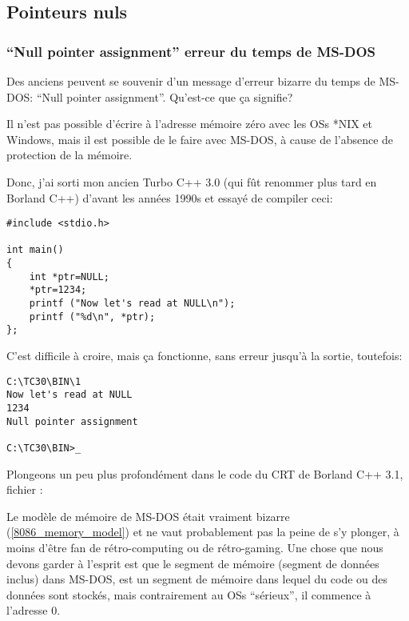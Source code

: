 \subsection{Pointeurs nuls}

\subsubsection{``Null pointer assignment'' erreur du temps de MS-DOS}

Des anciens peuvent se souvenir d'un message d'erreur bizarre du temps de MS-DOS:
``Null pointer assignment''.
Qu'est-ce que ça signifie?

Il n'est pas possible d'écrire à l'adresse mémoire zéro avec les OSs *NIX et Windows,
mais il est possible de le faire avec MS-DOS, à cause de l'absence de protection
de la mémoire.

Donc, j'ai sorti mon ancien Turbo C++ 3.0 (qui fût renommer plus tard en Borland C++)
d'avant les années 1990s et essayé de compiler ceci:

\begin{lstlisting}[style=customc]
#include <stdio.h>

int main()
{
	int *ptr=NULL;
	*ptr=1234;
	printf ("Now let's read at NULL\n");
	printf ("%d\n", *ptr);
};
\end{lstlisting}

C'est difficile à croire, mais ça fonctionne, sans erreur jusqu'à la sortie, toutefois:

\begin{lstlisting}[caption=Ancient Turbo C 3.0]
C:\TC30\BIN\1
Now let's read at NULL
1234
Null pointer assignment

C:\TC30\BIN>_
\end{lstlisting}

Plongeons un peu plus profondément dans le code du \ac{CRT} de Borland C++ 3.1, fichier :



Le modèle de mémoire de MS-DOS était vraiment bizarre (\ref{8086_memory_model}) et
ne vaut probablement pas la peine de s'y plonger, à moins d'être fan de rétro-computing
ou de rétro-gaming.
Une chose que nous devons garder à l'esprit est que le segment de mémoire (segment
de données inclus) dans MS-DOS, est un segment de mémoire dans lequel du code ou
des données sont stockés, mais contrairement au \ac{OS}s ``sérieux'', il commence
à l'adresse 0.


